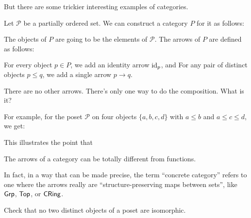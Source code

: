 But there are some trickier interesting examples of categories.
\begin{example}
	Let $\mathcal P$ be a partially ordered set.
	We can construct a category $P$ for it as follows:
	\begin{itemize}
		\ii The objects of $P$ are going to be the elements of $\mathcal P$.
		\ii The arrows of $P$ are defined as follows:
		\begin{itemize}
			\ii For every object $p \in P$, we add an identity arrow $\mathrm{id}_p$, and
			\ii For any pair of distinct objects $p \le q$, we add a single arrow $p \to q$.
		\end{itemize}
		There are no other arrows.
		\ii There's only one way to do the composition. What is it?
	\end{itemize}
\end{example}
For example, for the poset $\mathcal P$ on four objects $\{a,b,c,d\}$ with $a \le b$ and $a \le c \le d$, we get:
\begin{center}
\end{center}

This illustrates the point that
\begin{moral}
	The arrows of a category can be totally different from functions.
\end{moral}
In fact, in a way that can be made precise, the term ``concrete category'' refers
to one where the arrows really are ``structure-preserving maps between sets'',
like $\mathsf{Grp}$, $\mathsf{Top}$, or $\mathsf{CRing}$.

\begin{ques}
	Check that no two distinct objects of a poset are isomorphic.
\end{ques}

